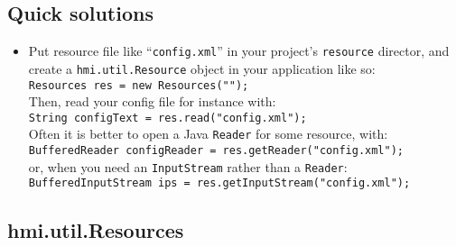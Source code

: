 \subsection{Quick solutions}
\begin{itemize}

\item Put resource file like ``\verb#config.xml#'' in your project's \verb#resource# director, 
and create a \verb#hmi.util.Resource# object in your application like so:\\
\verb#Resources res = new Resources("");#\\
Then, read your config file for instance with:\\
\verb#String configText = res.read("config.xml");#\\
Often it is better to open a Java \verb#Reader# for some resource, with:\\
\verb#BufferedReader configReader = res.getReader("config.xml");#\\
or, when you need an \verb#InputStream# rather than a \verb#Reader#:\\
\verb#BufferedInputStream ips = res.getInputStream("config.xml");#\\


\end{itemize}



\subsection{hmi.util.Resources}


